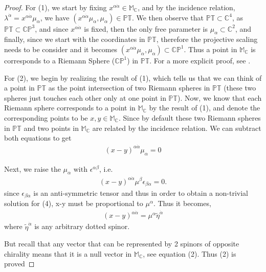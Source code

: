 \documentclass{article}
\begin{document}
 \begin{proof} 
   For (1), we start by fixing $x^{\alpha \dot{\alpha}} \in
   \mathbb{M_{C}}$, and by the incidence relation, $
   \lambda^{\dot{\alpha}} = x^{\alpha \dot{\alpha}} \mu_{\alpha} $, we
   have $(x^{\alpha \dot{\alpha}} \mu_{\alpha},\mu_{\alpha} ) \in
   \mathbb{PT}$. We then observe that $ \mathbb{PT} \subset 
   \mathbb{C}^4 $, as $ \mathbb{PT} \subset \mathbb{CP}^{3} $, and since
   $ x^{\alpha \dot{\alpha}} $ is fixed, then the only free parameter
   is $ \mu_{\alpha} \subset \mathbb{C}^2 $, and finally, since we start
   with the coordinates in $ \mathbb{PT} $, therefore the
   projective scaling needs to be consider and it becomes $
    (x^{\alpha \dot{\alpha}} \mu_{\alpha},\mu_{\alpha} ) \subset
    \mathbb{CP}^{1}$. Thus a point in $ \mathbb{M_{C}} $ is
    corresponds to a Riemann Sphere ($ \mathbb{CP}^{1} $) in $ \mathbb{PT}
    $. For a more explicit proof, see \cite{adamo2017lectures}.  
   
   

   For (2), we begin by realizing the result of (1), which tells us that
   we can think of a point in $ \mathbb{PT}  $ as the point intersection of
   two Riemann spheres in $ \mathbb{PT} $ (these two spheres just touches
   each other only at one point in $ \mathbb{PT} $). Now, we know that each Riemann sphere
   corresponds to a point in $\mathbb{M_{C}}$ by the result of (1), and
   denote the corresponding points to be $ x, y \in \mathbb{M_{C}}
   $. Since by default these two Riemann spheres in $  \mathbb{PT} $ and two
   points in $ \mathbb{M_{C}} $ are related by the incidence relation.
   We can subtract both equations to get 
   \begin{align}
     \label{x-y incidence}
     (x-y)^{\alpha \dot{\alpha}} \mu_{\alpha} = 0
   \end{align}

   Next, we raise the $ \mu_{\alpha} \text{  with }\epsilon^{\alpha \beta} $, i.e. 
   \begin{align}
     (x-y)^{\alpha \dot{\alpha}} \mu^{\beta} \epsilon_{\beta \alpha} =
     0
   .\end{align}
   since $ \epsilon_{\beta \alpha} $ is an anti-symmetric tensor and thus
   in order to obtain a non-trivial solution for (4), x-y must be
   proportional to $ \mu^{\alpha} $. Thus it becomes,
   \begin{align}
    \label{5}
     (x-y)^{\alpha \dot{\alpha}} = \mu^{\alpha}
     \tilde{\eta}^{\dot{\alpha}} 
   \end{align}  
   where $ \tilde{\eta}^{\dot{\alpha}}$ is any arbitrary dotted spinor. 
    
    But recall that any vector that can be represented by 2 spinors
    of opposite chirality means that it is a null vector in $\mathbb{M_{C}}$, see equation
    (2). Thus (2) is proved 
 \end{proof}
\end{document}
